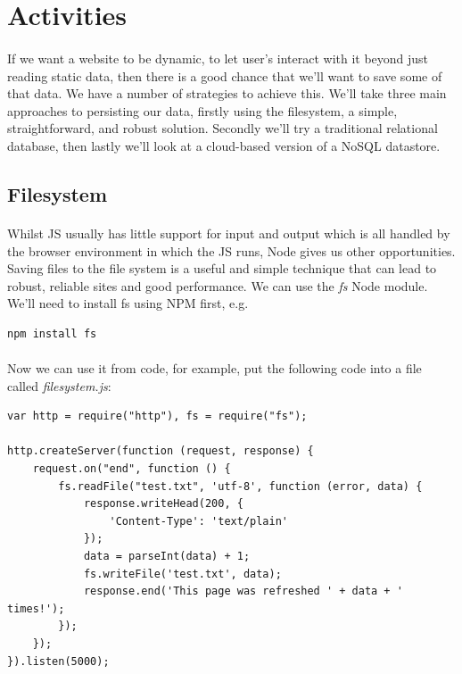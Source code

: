 \documentclass[10pt, a4paper, twosize]{article}
\begin{document}


\section{Activities}

\paragraph{} If we want a website to be dynamic, to let user's interact with it beyond just reading static data, then there is a good chance that we'll want to save some of that data. We have a number of strategies to achieve this. We'll take three main approaches to persisting our data, firstly using the filesystem, a simple, straightforward, and robust solution. Secondly we'll try a traditional relational database, then lastly we'll look at a cloud-based version of a NoSQL datastore.

\subsection{Filesystem}
\paragraph{} Whilst JS usually has little support for input and output which is all handled by the browser environment in which the JS runs, Node gives us other opportunities. Saving files to the file system is a useful and simple technique that can lead to robust, reliable sites and good performance. We can use the \emph{fs} Node module. We'll need to install fs using NPM first, e.g.

\begin{lstlisting}[style=DOS]
    npm install fs
\end{lstlisting}

\paragraph{} Now we can use it from code, for example, put the following code into a file called \emph{filesystem.js}:

\begin{lstlisting}
var http = require("http"),	fs = require("fs");

http.createServer(function (request, response) {
	request.on("end", function () {
		fs.readFile("test.txt", 'utf-8', function (error, data) {
			response.writeHead(200, {
				'Content-Type': 'text/plain'
			});
			data = parseInt(data) + 1;
			fs.writeFile('test.txt', data);
			response.end('This page was refreshed ' + data + ' times!');
		});
	});
}).listen(5000);
\end{lstlisting}
\end{document}
